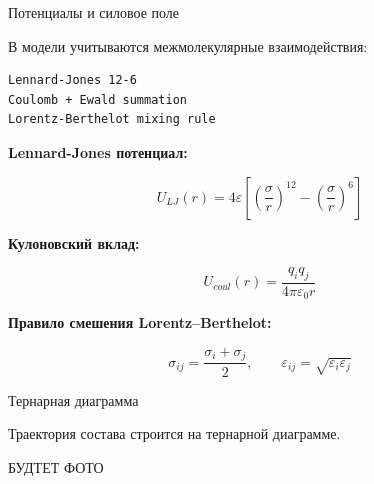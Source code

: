 \documentclass[10pt, aspectratio=169]{beamer}
\begin{document}
\begin{frame}[fragile]{Потенциалы и силовое поле}

В модели учитываются межмолекулярные взаимодействия:

\begin{lstlisting}
Lennard-Jones 12-6
Coulomb + Ewald summation
Lorentz-Berthelot mixing rule
\end{lstlisting}

\vspace{0.2cm}

\textbf{Lennard-Jones потенциал:}

\[
    U_{LJ}(r)
    =
    4 \varepsilon
    \left[
        \left( \frac{\sigma}{r} \right)^{12}
        -
        \left( \frac{\sigma}{r} \right)^6
    \right]
\]

\textbf{Кулоновский вклад:}

\[
    U_{coul}(r)
    =
    \frac{q_i q_j}{4 \pi \varepsilon_0 r}
\]

\textbf{Правило смешения Lorentz--Berthelot:}

\[
    \sigma_{ij}
    =
    \frac{\sigma_i + \sigma_j}{2},
    \qquad
    \varepsilon_{ij}
    =
    \sqrt{\varepsilon_i \varepsilon_j}
\]

\end{frame}


\begin{frame}{Тернарная диаграмма}

Траектория состава строится на тернарной диаграмме.

\vspace{0.3cm}

БУДТЕТ ФОТО
\end{frame}
\end{document}
